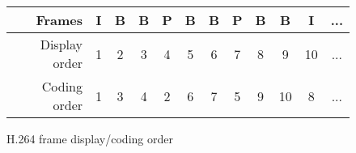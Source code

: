 \begin{figure}
\centering
{\setlength{\tabcolsep}{3pt}
\begin{tabular}{|r||ccccccccc|cc|}
\hline
Frames                                                       & I & B & B & P & B & B & P & B & B  & I  & ... \\ \hline
Display order                                                & 1 & 2 & 3 & 4 & 5 & 6 & 7 & 8 & 9  & 10 & ... \\ \hline
Coding order & 1 & 3 & 4 & 2 & 6 & 7 & 5 & 9 & 10 & 8  & ... \\
\hline
\end{tabular}}
\caption{H.264 frame display/coding order}
\vspace{-0.3in}
\label{fig:frame-order}
\end{figure}